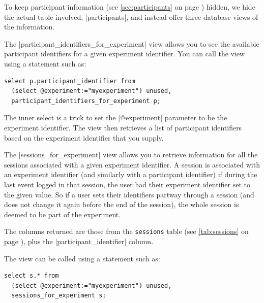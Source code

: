 \documentclass{report}
\newcommand{\myref}[1]{\autoref{#1} on page \pageref*{#1}}
\newcommand{\tabref}[1]{\lstinline|#1| table (see \myref{tab:#1})}
\begin{document}
To keep participant information (see \myref{sec:participants}) hidden,
we hide the actual table involved, |participants|, and instead offer three
database views of the information.


The |participant_identifiers_for_experiment| view allows you to see the
available participant identifiers for a given experiment identifier.  You can
call the view using a statement such as:

\begin{lstlisting}
select p.participant_identifier from
  (select @experiment:="myexperiment") unused,
  participant_identifiers_for_experiment p;
\end{lstlisting}

The inner select is a trick to set the |@experiment| parameter to be the
experiment identifier.  The view then retrieves a list of participant
identifiers based on the experiment identifier that you supply.



The |sessions_for_experiment| view allows you to retrieve information for all
the sessions associated with a given experiment identifier.  A session is
associated with an experiment identifier (and similarly with a participant
identifier) if during the last event logged in that session, the user had
their experiment identifier set to the given value.  So if a user sets their
identifiers partway through a session (and does not change it again before the
end of the session), the whole session is deemed to be part of the experiment.

The columns returned are those from the \tabref{sessions}, plus the
|participant_identifier| column.

The view can be called using a statement such as:

\begin{lstlisting}
select s.* from
  (select @experiment:="myexperiment") unused,
  sessions_for_experiment s;
\end{lstlisting}



\end{document}
